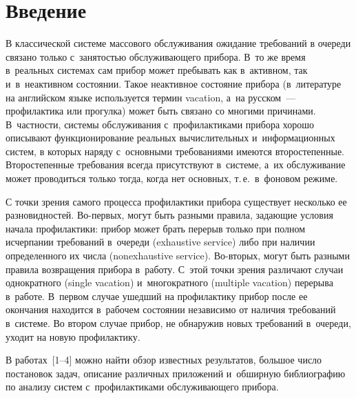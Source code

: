 
  



\thispagestyle{headings}

\begin{multicols}{2}

\label{st\stat}

\section{Введение}

В классической системе массового обслуживания ожидание требований
в очереди связано только с~занятостью обслуживающего прибора. В~то
же время в~реальных системах сам  прибор может пребывать как 
в~активном, так и~в~неактивном состоянии. Такое неактивное
состояние прибора (в~литературе на английском языке используется
термин vacation, а~на русском~--- профилактика или прогулка) может
быть связано со многими причинами. В~част\-ности, сис\-те\-мы
обслуживания с~профилактиками прибора хорошо описывают
функционирование  реальных вычислительных и~информационных систем,
в которых наряду с~основными требованиями имеются второстепенные.
Второстепенные требования всегда присутствуют в~сис\-те\-ме, а~их
обслуживание может проводиться только тогда, когда нет основных,
т.\,е.\ в~фоновом режиме.

С точки зрения самого процесса профилактики прибора существует
несколько ее разновидностей. Во-пер\-вых, могут быть разными
правила, задающие условия начала профилактики: прибор может брать
перерыв только при  полном исчерпании требований в~очереди
(exhaustive service) либо при наличии определенного их числа
(nonexhaustive service). Во-вто\-рых, могут быть разными правила
возвращения прибора в~работу. С~этой точки зрения различают случаи
однократного (single vacation) и~многократного (multiple vacation)
перерыва в~работе. В~первом случае ушедший на профилактику прибор
после ее окончания находится в~рабочем состоянии независимо от
наличия требований в~системе. Во втором случае прибор, не
обнаружив новых требований в~очереди, уходит на новую
профилактику.


В работах~[1--4] можно найти обзор известных результатов, большое
число постановок задач, описание различных приложений и~обширную
библиографию по анализу систем с~профилактиками обслуживающего
прибора.



\end{multicols}
